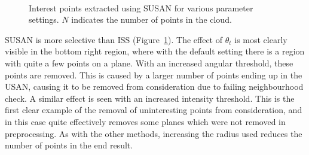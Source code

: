 \documentclass[11pt,a4paper]{kth-mag}
\begin{document}
\begin{figure}
{    
    \\
  }
  \caption{Interest points extracted using SUSAN for various parameter settings.
    $N$ indicates the number of points in the cloud.}
  \label{fig:intsusan}
\end{figure}

SUSAN is more selective than ISS (Figure~\ref{fig:intsusan}). The effect of
$\theta_t$ is most clearly visible in the bottom right region, where with the
default setting there is a region with quite a few points on a plane. With an
increased angular threshold, these points are removed. This is caused by a
larger number of points ending up in the USAN, causing it to be removed from
consideration due to failing neighbourhood check. A similar effect is seen with
an increased intensity threshold. This is the first clear example of the removal
of uninteresting points from consideration, and in this case quite effectively
removes some planes which were not removed in preprocessing. As with the other
methods, increasing the radius used reduces the number of points in the end
result.
\end{document}
